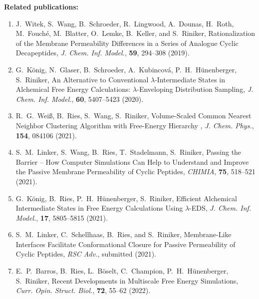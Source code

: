 \newpage
\noindent \textbf{Related publications:}
\begin{enumerate}
    \item J.\ Witek, S.\ Wang, B.\ Schroeder, R.\ Lingwood, A.\ Dounas, H.\ Roth, M.\ Fouché, M.\ Blatter, O.\ Lemke, B.\ Keller, and S.\ Riniker, Rationalization of the Membrane Permeability Differences in a Series of Analogue Cyclic Decapeptides, {\em J. Chem. Inf. Model.}, \textbf{59}, 294--308 (2019).
    \item  G.\ K\"onig, N.\ Glaser, B.\ Schroeder, A.\ Kubincová, P.\ H.\ H\"unenberger, S.\ Riniker, An Alternative to Conventional $\lambda$-Intermediate States in Alchemical Free Energy Calculations: $\lambda$-Enveloping Distribution Sampling, {\em J. Chem. Inf. Model.}, \textbf{60}, 5407--5423 (2020).
    \item R.\ G.\ Wei\ss, B.\ Ries, S.\ Wang, S.\ Riniker, Volume-Scaled Common Nearest Neighbor Clustering Algorithm with Free-Energy Hierarchy , {\em J. Chem. Phys.}, \textbf{154}, 084106 (2021).
    \item S.\ M.\ Linker, S.\ Wang, B.\ Ries, T.\ Stadelmann, S.\ Riniker, Passing the Barrier – How Computer Simulations Can Help to Understand and Improve the Passive Membrane Permeability of Cyclic Peptides, {\em CHIMIA}, \textbf{75}, 518--521 (2021).
    \item G.\ K\"onig, B.\ Ries, P.\ H.\ H\"unenberger, S.\ Riniker, Efficient Alchemical Intermediate States in Free Energy Calculations Using  $\lambda$-EDS, {\em J. Chem. Inf. Model.}, \textbf{17}, 5805--5815 (2021).
    \item S.\ M.\ Linker, C.\ Schellhaas, B.\ Ries, and S.\ Riniker, Membrane-Like Interfaces Facilitate Conformational Closure for Passive Permeability of Cyclic Peptides, {\em RSC Adv.}, submitted (2021).
    \item E.\ P.\ Barros, B.\ Ries, L.\ B\"oselt, C.\ Champion, P.\ H.\ H\"unenberger, S.\ Riniker, Recent Developments in Multiscale Free Energy Simulations, {\em Curr. Opin. Struct. Biol.}, \textbf{72}, 55--62 (2022).
\end{enumerate}
